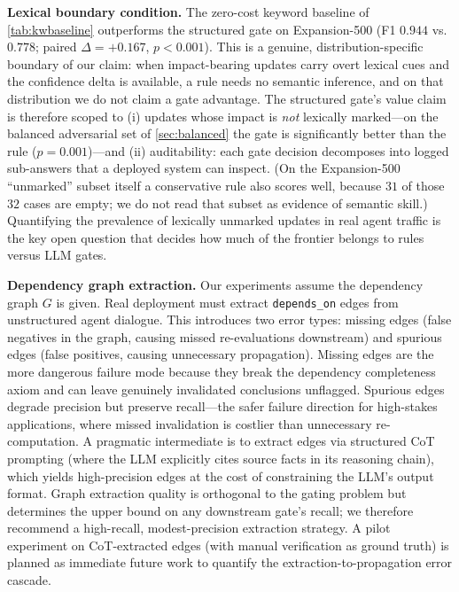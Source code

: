 \documentclass{article}
\theoremstyle{definition}
\begin{document}
\textbf{Lexical boundary condition.}  The zero-cost keyword baseline
of \cref{tab:kwbaseline} outperforms the structured gate on
Expansion-500 (F1 $0.944$ vs.\ $0.778$; paired $\Delta=+0.167$,
$p<0.001$).  This is a genuine, distribution-specific boundary of our
claim: when impact-bearing updates carry overt lexical cues and the
confidence delta is available, a rule needs no semantic inference, and on
that distribution we do not claim a gate advantage.  The structured
gate's value claim is therefore scoped to (i) updates whose impact is
\emph{not} lexically marked---on the balanced adversarial set of
\cref{sec:balanced} the gate is significantly better than the rule
($p=0.001$)---and (ii) auditability: each gate decision decomposes into
logged sub-answers that a deployed system can inspect.  (On the
Expansion-500 ``unmarked'' subset itself a conservative rule also scores
well, because $31$ of those $32$ cases are empty; we do not read that
subset as evidence of semantic skill.)  Quantifying the prevalence of
lexically unmarked updates in real
agent traffic is the key open question that decides how much of the
frontier belongs to rules versus LLM gates.

\textbf{Dependency graph extraction.}  Our experiments assume the
dependency graph $G$ is given.  Real deployment must extract
\texttt{depends\_on} edges from unstructured agent dialogue.  This
introduces two error types: missing edges (false negatives in the
graph, causing missed re-evaluations downstream) and spurious edges
(false positives, causing unnecessary propagation).  Missing edges
are the more dangerous failure mode because they break the dependency
completeness axiom and can leave genuinely invalidated conclusions
unflagged.  Spurious edges degrade precision but preserve recall---the
safer failure direction for high-stakes applications, where missed
invalidation is costlier than unnecessary re-computation.  A pragmatic
intermediate is to extract edges via structured CoT prompting (where
the LLM explicitly cites source facts in its reasoning chain), which
yields high-precision edges at the cost of constraining the LLM's
output format.  Graph extraction quality is orthogonal to the gating
problem but determines the upper bound on any downstream gate's recall;
we therefore recommend a high-recall, modest-precision extraction
strategy.  A pilot experiment on CoT-extracted
edges (with manual verification as ground truth) is planned as
immediate future work to quantify the extraction-to-propagation error
cascade.
\end{document}
